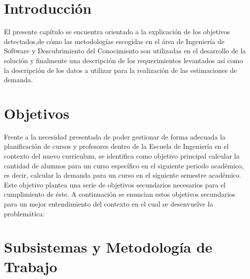 \section{Introducción \label{sec:cap_three_introduction}}
El presente capítulo se encuentra orientado a la explicación de los objetivos detectados,de cómo las metodologías escogidas en el área de Ingeniería de Software y Descubrimiento del Conocimiento son utilizadas en el desarrollo de la solución y finalmente una descripción de los requerimientos levantados así como la descripción de los datos a utilizar para la realización de las estimaciones de demanda.

\section{Objetivos \label{sec:goals}}

Frente a la necesidad presentada de poder gestionar de forma adecuada la planificación de cursos y profesores dentro de la Escuela de Ingeniería en el contexto del nuevo curriculum, se identifica como objetivo principal calcular la cantidad de alumnos para un curso específico en el siguiente periodo académico, es decir, calcular la demanda para un curso en el siguiente semestre académico. Este objetivo plantea una serie de objetivos secundarios necesarios para el cumplimiento de éste. A continuación se enuncian estos objetivos secundarios para un mejor entendimiento del contexto en el cual se desenvuelve la problemática:

\section{Subsistemas y Metodología de Trabajo \label{sec:work_environment}}

